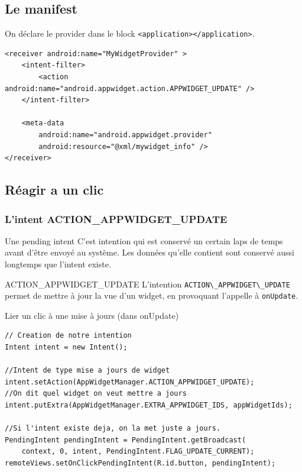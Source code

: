 \documentclass{beamer}
\begin{document}
\subsection{Le manifest}
\begin{frame}[fragile]
\begin{block}{On déclare le provider dans le block \verb!<application></application>!.}
\lstset{language=xml}
\begin{lstlisting}
<receiver android:name="MyWidgetProvider" >
    <intent-filter>
        <action android:name="android.appwidget.action.APPWIDGET_UPDATE" />
    </intent-filter>

    <meta-data
        android:name="android.appwidget.provider"
        android:resource="@xml/mywidget_info" />
</receiver>
\end{lstlisting}
\end{block}
\end{frame}

\subsection{Réagir a un clic}
\begin{frame}
\frametitle{L'intent ACTION\_APPWIDGET\_UPDATE}
\begin{block}{Une pending intent}
C'est intention qui est conservé un certain laps de temps avant d’être envoyé au système. Les données qu'elle contient sont conservé aussi longtemps que l'intent existe.
\end{block}
\begin{block}{ACTION\_APPWIDGET\_UPDATE}
L'intention \verb!ACTION\_APPWIDGET\_UPDATE! permet de mettre à jour la vue d'un widget, en provoquant l'appelle à \verb!onUpdate!.
\end{block}
\end{frame}

\begin{frame}[fragile]
\lstset{language=java}
\begin{block}{Lier un clic à une mise à jours (dans onUpdate)}
\begin{lstlisting}
// Creation de notre intention
Intent intent = new Intent();

//Intent de type mise a jours de widget
intent.setAction(AppWidgetManager.ACTION_APPWIDGET_UPDATE);
//On dit quel widget on veut mettre a jours
intent.putExtra(AppWidgetManager.EXTRA_APPWIDGET_IDS, appWidgetIds);

//Si l'intent existe deja, on la met juste a jours.
PendingIntent pendingIntent = PendingIntent.getBroadcast(
    context, 0, intent, PendingIntent.FLAG_UPDATE_CURRENT);
remoteViews.setOnClickPendingIntent(R.id.button, pendingIntent);
\end{lstlisting}
\end{block}
\end{frame}
\end{document}
